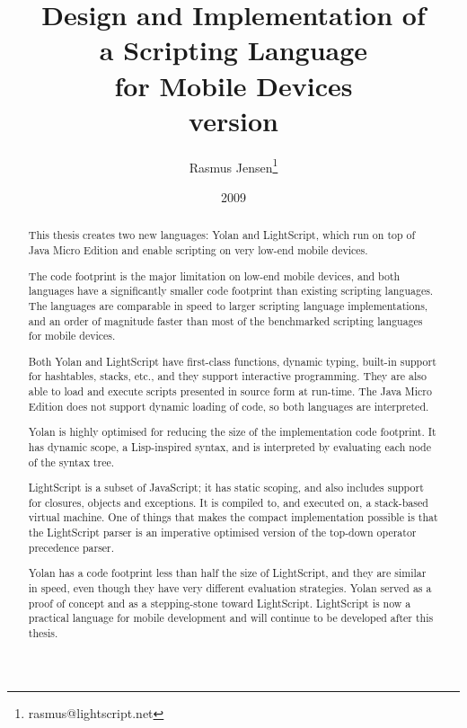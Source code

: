 \documentclass[11pt]{report}
\title{
Design and Implementation of \\
a Scripting Language \\ 
for Mobile Devices \\
{\scriptsize version }}
\author{
  Rasmus Jensen\footnote{
    rasmus@lightscript.net
  }
}
\date{2009}
\begin{document}
\maketitle
\renewcommand\abstractname{Abstract}
\begin{abstract}
This thesis creates two new languages: Yolan and LightScript, which run on top of Java Micro Edition and enable scripting on very low-end mobile devices.

The code footprint is the major limitation on low-end mobile devices, and both languages have a significantly smaller code footprint than existing scripting languages. 
The languages are comparable in speed to larger scripting language implementations,
and an order of magnitude faster than most of the benchmarked scripting languages for mobile devices.

Both Yolan and LightScript have first-class functions, dynamic typing, built-in support for hashtables, stacks, etc., and they support interactive programming. They are also able to load and execute scripts presented in source form at run-time. 
The Java Micro Edition does not support dynamic loading of code, so both languages are interpreted.

Yolan is highly optimised for reducing the size of the implementation code footprint. It has dynamic scope, a Lisp-inspired syntax, and is interpreted by evaluating each node of the syntax tree. 

LightScript is a subset of JavaScript; it has static scoping, and also includes support for closures, objects and exceptions. It is compiled to, and executed on, a stack-based virtual machine. One of things that makes the compact implementation possible is that the LightScript parser is an imperative optimised version of the top-down operator precedence parser.

Yolan has a code footprint less than half the size of LightScript, and they are similar in speed, even though they have very different evaluation strategies.
Yolan served as a proof of concept and as a stepping-stone toward LightScript. 
LightScript is now a practical language for mobile development and will continue to be developed after this thesis.
\end{abstract}
\end{document}
